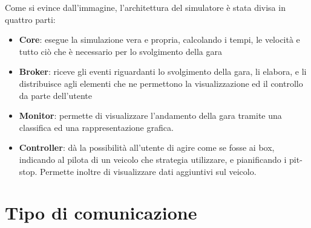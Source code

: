 Come si evince dall'immagine, l'architettura del simulatore è stata divisa in quattro parti:
\begin{itemize}
 \item \textbf{Core}: esegue la simulazione vera e propria, calcolando i tempi, le velocità e tutto ciò che è necessario per lo svolgimento della gara
 \item \textbf{Broker}: riceve gli eventi riguardanti lo svolgimento della gara, li elabora, e li distribuisce agli elementi che ne permettono la visualizzazione ed il controllo da parte dell’utente
 \item \textbf{Monitor}: permette di visualizzare l’andamento della gara tramite una classifica ed una rappresentazione grafica.
 \item \textbf{Controller}: dà la possibilità all’utente di agire come se fosse ai box, indicando al pilota di un veicolo che strategia utilizzare, e pianificando i pit-stop. Permette inoltre di visualizzare dati aggiuntivi sul veicolo.
\end{itemize}


\section{Tipo di comunicazione}

